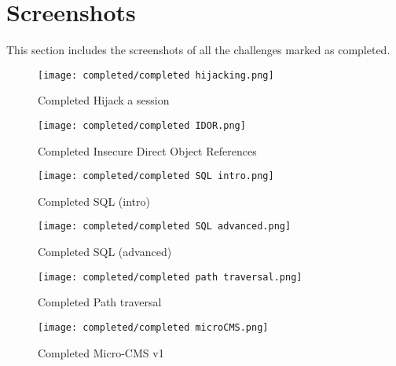 \documentclass{article}
\begin{document}
\section{Screenshots}
This section includes the screenshots of all the challenges marked as completed.
\begin{figure}[H]
    \centering
    \texttt{[image: completed/completed hijacking.png]}
    \caption{Completed Hijack a session}
    \label{fig:chas}
\end{figure}
\begin{figure}[H]
    \centering
    \texttt{[image: completed/completed IDOR.png]}
    \caption{Completed Insecure Direct Object References}
    \label{fig:cidor}
\end{figure}
\begin{figure}[H]
    \centering
    \texttt{[image: completed/completed SQL intro.png]}
    \caption{Completed SQL (intro)}
    \label{fig:csqli}
\end{figure}
\begin{figure}[H]
    \centering
    \texttt{[image: completed/completed SQL advanced.png]}
    \caption{Completed SQL (advanced)}
    \label{fig:csqla}
\end{figure}
\begin{figure}[H]
    \centering
    \texttt{[image: completed/completed path traversal.png]}
    \caption{Completed Path traversal}
    \label{fig:cpt}
\end{figure}
\begin{figure}[H]
    \centering
    \texttt{[image: completed/completed microCMS.png]}
    \caption{Completed Micro-CMS v1}
    \label{fig:cmcms1}
\end{figure}
\end{document}
